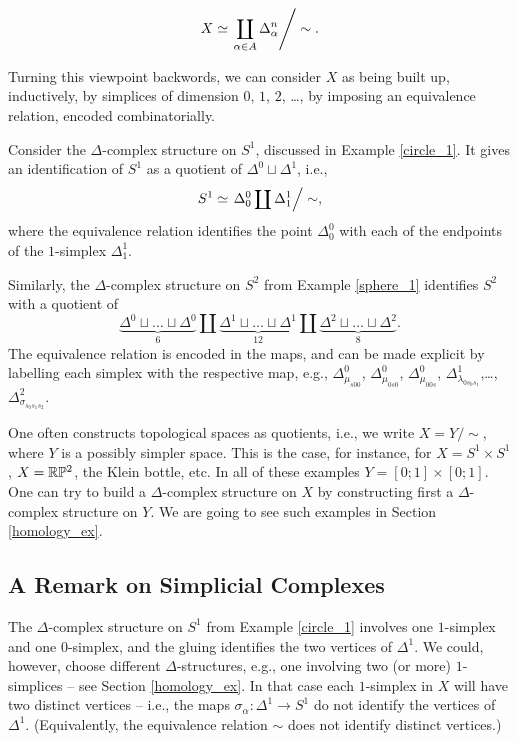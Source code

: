 \documentclass[11pt,a4paper]{report}
\begin{document}
	  \[
	  	X \simeq \left. \coprod_{\alpha\in A}\Delta^{n}_\alpha\right/ \sim.
	  \]
	  
	  Turning this viewpoint backwords, we can consider $X$ as being built up, inductively, by simplices of dimension $0$, $1$, $2$, \ldots, 
	  by imposing an equivalence relation, encoded combinatorially.
	  
	  \begin{Ex}
	  	Consider the $\Delta$-complex structure on $S^1$, discussed in Example \ref{circle_1}. It gives an identification
	  	of $S^1$ as a quotient of $\Delta^0\sqcup \Delta^1$, i.e., 
	  	\[
	  		S^1\simeq \left. \Delta_0^0\coprod \Delta^1_1\right/\sim,
	  	\]
	  	where the equivalence relation identifies the point $\Delta_0^0$ with each of the endpoints of the $1$-simplex $\Delta_1^1$.
	  	
	  	Similarly, the $\Delta$-complex structure on $S^2$ from Example  \ref{sphere_1} identifies $S^2$ with a quotient of
	  	\[
	  		\underbrace{\Delta^0\sqcup \ldots \sqcup \Delta^0}_{6}\coprod \underbrace{\Delta^1\sqcup \ldots \sqcup\Delta^1}_{12}\coprod \underbrace{\Delta^2\sqcup \ldots \sqcup\Delta^2}_{8}.
	  	\]
	  	The equivalence relation is encoded in the maps, and can be made explicit by labelling each simplex with the respective map, 
	  	e.g., $\Delta^0_{\mu_{s00}}$, $\Delta^0_{\mu_{0s0}}$, $\Delta^0_{\mu_{00s}}$, $\Delta^1_{\lambda_{0s_0s_1}}$,\ldots, $\Delta^2_{\sigma_{s_0s_1s_2}}$.


	  \end{Ex}
	  
	  One often constructs topological spaces as quotients, i.e., we write $X=Y/\sim$, where $Y$ is a possibly simpler space. This is the case, for instance, for
	  $X=S^1\times S^1$, $X=\mathbb{R}\mathbb{P}^2$, the Klein bottle, etc. In all of these examples $Y=[0;1]\times [0;1]$. One can try to build a $\Delta$-complex structure
	  on $X$ by constructing first a $\Delta$-complex structure on $Y$. We are going to see such examples in Section \ref{homology_ex}.
	  
	  \subsection*{A Remark on Simplicial Complexes}
	  
	  The $\Delta$-complex structure on $S^1$ from Example \ref{circle_1} involves one $1$-simplex and one $0$-simplex, and the gluing identifies the two vertices of
	  $\Delta^1$. We could, however, choose different $\Delta$-structures, e.g., one involving two (or more) $1$-simplices -- see Section \ref{homology_ex}.
	  In that case each $1$-simplex in $X$ will have two distinct vertices -- i.e., the maps $\sigma_\alpha:\Delta^1\to S^1$ do not identify the vertices
	  of $\Delta^1$. (Equivalently, the equivalence relation $\sim$ does not identify distinct vertices.)
	  
\end{document}
